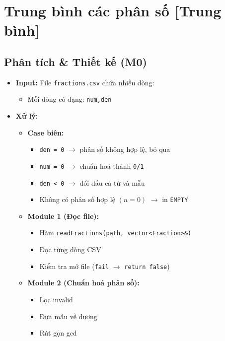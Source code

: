 \section{Trung bình các phân số [Trung bình]}
\subsection{Phân tích \& Thiết kế (M0)}
\begin{itemize}
    \item \textbf{Input:}
    File \texttt{fractions.csv} chứa nhiều dòng:
    \begin{itemize}
        \item Mỗi dòng có dạng: \texttt{num,den}
    \end{itemize}

    \item \textbf{Xử lý:}
    \begin{itemize}
        \item \textbf{Case biên:}
        \begin{itemize}
            \item \texttt{den = 0} $\rightarrow$ phân số không hợp lệ, bỏ qua
            \item \texttt{num = 0} $\rightarrow$ chuẩn hoá thành \texttt{0/1}
            \item \texttt{den < 0} $\rightarrow$ đổi dấu cả tử và mẫu
            \item Không có phân số hợp lệ $(n=0)$ $\rightarrow$ in \texttt{EMPTY}
        \end{itemize}

        \item \textbf{Module 1 (Đọc file):}
        \begin{itemize}
            \item Hàm \texttt{readFractions(path, vector<Fraction>\&)}
            \item Đọc từng dòng CSV
            \item Kiểm tra mở file (\texttt{fail} $\rightarrow$ \texttt{return false})
        \end{itemize}

        \item \textbf{Module 2 (Chuẩn hoá phân số):}
        \begin{itemize}
            \item Lọc invalid
            \item Đưa mẫu về dương
            \item Rút gọn gcd
        \end{itemize}


\end{itemize}
\end{itemize}
